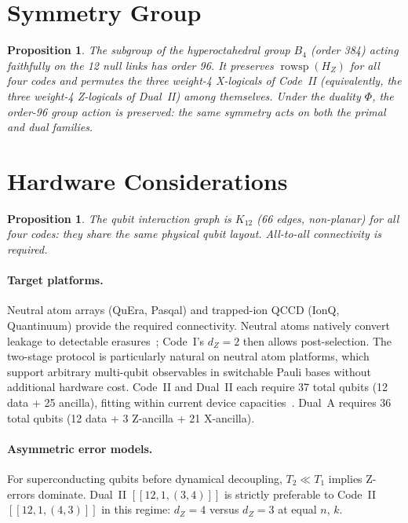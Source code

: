 \documentclass[12pt,a4paper]{article}
\theoremstyle{plain}
\newtheorem{proposition}[theorem]{Proposition}
\theoremstyle{definition}
\theoremstyle{remark}
\newcommand{\HZ}{H_Z}
\newcommand{\rowsp}{\operatorname{rowsp}}
\begin{document}
\section{Symmetry Group}\label{sec:symmetry}

\begin{proposition}\label{prop:symmetry}
The subgroup of the hyperoctahedral group $B_4$ (order 384) acting
faithfully on the 12 null links has order 96.
It preserves $\rowsp(\HZ)$ for all four codes and permutes the three
weight-4 X-logicals of Code~II (equivalently, the three weight-4
Z-logicals of Dual~II) among themselves.
Under the duality $\Phi$, the order-96 group action is preserved:
the same symmetry acts on both the primal and dual families.
\end{proposition}

\section{Hardware Considerations}\label{sec:hardware}

\begin{proposition}
The qubit interaction graph is $K_{12}$ (66 edges, non-planar) for
all four codes: they share the same physical qubit layout.
All-to-all connectivity is required.
\end{proposition}

\paragraph{Target platforms.}
Neutral atom arrays (QuEra, Pasqal) and trapped-ion QCCD (IonQ,
Quantinuum) provide the required connectivity.
Neutral atoms natively convert leakage to detectable erasures~\cite{Wu2022};
Code~I's $d_Z=2$ then allows post-selection.
The two-stage protocol is particularly natural on neutral atom platforms,
which support arbitrary multi-qubit observables in switchable Pauli bases
without additional hardware cost.
Code~II and Dual~II each require 37 total qubits (12 data + 25 ancilla),
fitting within current device capacities~\cite{Evered2023}.
Dual~A requires 36 total qubits (12 data + 3 Z-ancilla + 21 X-ancilla).

\paragraph{Asymmetric error models.}
For superconducting qubits before dynamical decoupling, $T_2 \ll T_1$
implies Z-errors dominate.
Dual~II $[[12,1,(3,4)]]$ is strictly preferable to Code~II $[[12,1,(4,3)]]$
in this regime: $d_Z=4$ versus $d_Z=3$ at equal $n$, $k$.
\end{document}
